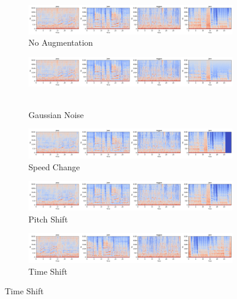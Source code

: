 \begin{figure}[!htb]
    \centering
    \begin{subfigure}{0.9\textwidth}
        \includegraphics[scale=0.28]{Images/gtzan_new/no_augmentation.png}
        \caption{No Augmentation}
    \end{subfigure}
    \vspace{0.3cm}

    \begin{subfigure}{0.9\textwidth}
        \includegraphics[scale=0.28]{Images/gtzan_new/gn_augmentation.png}\
        \caption{Gaussian Noise}
    \end{subfigure}
    \vspace{0.3cm}

    \begin{subfigure}{0.9\textwidth}
        \includegraphics[scale=0.28]{Images/gtzan_new/speedchange_augmentation.png}
        \caption{Speed Change}
    \end{subfigure}
    \vspace{0.3cm}

    \begin{subfigure}{0.9\textwidth}
        \includegraphics[scale=0.28]{Images/gtzan_new/pitchshift_augmentation.png}
        \caption{Pitch Shift}
    \end{subfigure}

    \begin{subfigure}{0.9\textwidth}
        \includegraphics[scale=0.28]{Images/gtzan_new/time_shift_augmentation.png}
        \caption{Time Shift}
    \end{subfigure}


\end{figure}
